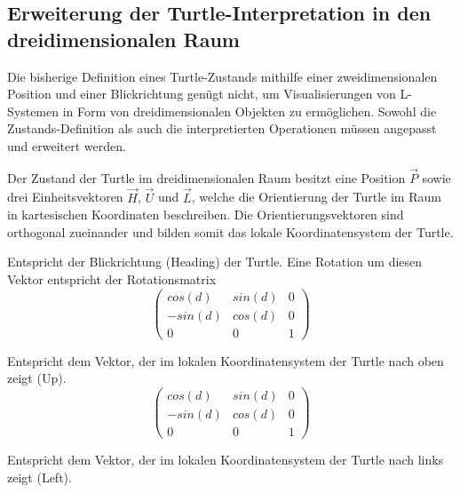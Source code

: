 \subsection{Erweiterung der Turtle-Interpretation in den dreidimensionalen Raum}

Die bisherige Definition eines Turtle-Zustands mithilfe einer zweidimensionalen Position und einer Blickrichtung genügt nicht, um Visualisierungen von L-Systemen in Form von dreidimensionalen Objekten zu ermöglichen. Sowohl die Zustands-Definition als auch die interpretierten Operationen müssen angepasst und erweitert werden.

Der Zustand der Turtle im dreidimensionalen Raum besitzt eine Position $\overrightarrow{P}$ sowie drei Einheitsvektoren $\overrightarrow{H}$, $\overrightarrow{U}$ und $\overrightarrow{L}$, welche die Orientierung der Turtle im Raum in kartesischen Koordinaten beschreiben. Die Orientierungsvektoren sind orthogonal zueinander und bilden somit das lokale Koordinatensystem der Turtle.

\begin{description}[5cm]
		\item[\boldmath$\overrightarrow{H}$]Entspricht der Blickrichtung (Heading) der Turtle. Eine Rotation um diesen Vektor entspricht der Rotationsmatrix \\
		\begin{equation}
		\begin{pmatrix}
		cos(d) & sin(d) & 0 \\
		-sin(d)& cos(d) & 0 \\
		0 & 0 & 1
		\end{pmatrix}	
		\label{eq:rotH}
		\end{equation} 
		\item[\boldmath$\overrightarrow{U}$]Entspricht dem Vektor, der im lokalen Koordinatensystem der Turtle nach oben zeigt (Up).\\
		\begin{equation}
		\begin{pmatrix}
		cos(d) & sin(d) & 0 \\
		-sin(d)& cos(d) & 0 \\
		0 & 0 & 1
		\end{pmatrix}	
		\label{eq:rotU}
		\end{equation} 
		\item[\boldmath$\overrightarrow{L}$]Entspricht dem Vektor, der im lokalen Koordinatensystem der Turtle nach links zeigt (Left).
\end{description}


